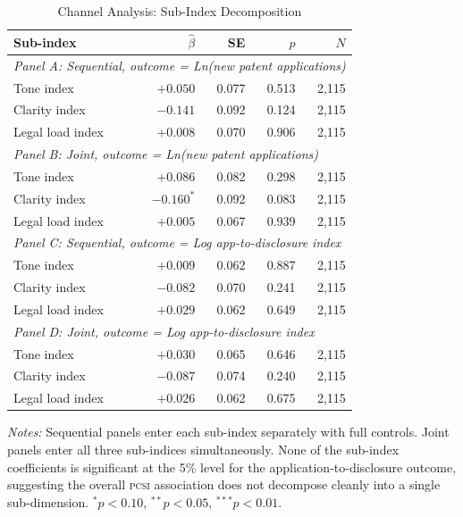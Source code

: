 \documentclass[12pt]{article}
\newcommand{\PCSI}{\textsc{pcsi}}
\begin{document}
\begin{table}[htbp]
\centering
\caption{Channel Analysis: Sub-Index Decomposition}
\label{tab:channel}
\begin{threeparttable}
\begin{tabular}{lrrrr}
\toprule
Sub-index & $\hat\beta$ & SE & $p$ & $N$ \\
\midrule
\multicolumn{5}{l}{\textit{Panel A: Sequential, outcome = Ln(new patent applications)}} \\
Tone index & $+0.050$ & 0.077 & 0.513 & 2,115 \\
Clarity index & $-0.141$ & 0.092 & 0.124 & 2,115 \\
Legal load index & $+0.008$ & 0.070 & 0.906 & 2,115 \\
\midrule
\multicolumn{5}{l}{\textit{Panel B: Joint, outcome = Ln(new patent applications)}} \\
Tone index & $+0.086$ & 0.082 & 0.298 & 2,115 \\
Clarity index & $-0.160^*$ & 0.092 & 0.083 & 2,115 \\
Legal load index & $+0.005$ & 0.067 & 0.939 & 2,115 \\
\midrule
\multicolumn{5}{l}{\textit{Panel C: Sequential, outcome = Log app-to-disclosure index}} \\
Tone index & $+0.009$ & 0.062 & 0.887 & 2,115 \\
Clarity index & $-0.082$ & 0.070 & 0.241 & 2,115 \\
Legal load index & $+0.029$ & 0.062 & 0.649 & 2,115 \\
\midrule
\multicolumn{5}{l}{\textit{Panel D: Joint, outcome = Log app-to-disclosure index}} \\
Tone index & $+0.030$ & 0.065 & 0.646 & 2,115 \\
Clarity index & $-0.087$ & 0.074 & 0.240 & 2,115 \\
Legal load index & $+0.026$ & 0.062 & 0.675 & 2,115 \\
\bottomrule
\end{tabular}
\begin{tablenotes}
\small
\item \textit{Notes:} Sequential panels enter each sub-index separately with full
controls. Joint panels enter all three sub-indices simultaneously. None of the
sub-index coefficients is significant at the 5\% level for the application-to-disclosure
outcome, suggesting the overall \PCSI{} association does not decompose cleanly into
a single sub-dimension. $^*p<0.10$, $^{**}p<0.05$, $^{***}p<0.01$.
\end{tablenotes}
\end{threeparttable}
\end{table}
\end{document}
